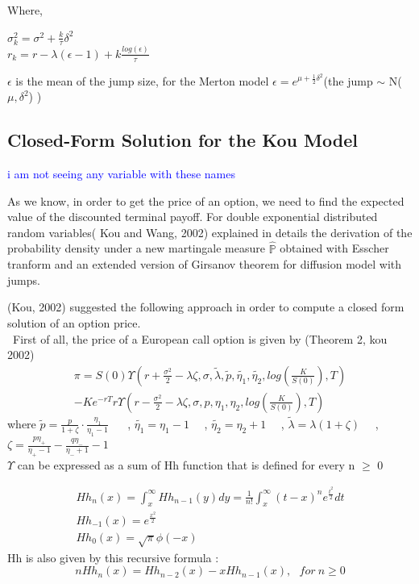 \documentclass[12pt]{report}
\begin{document}
Where,
\begin{center}
$\sigma_k^2=\sigma^2+\frac{k}{\tau} \delta^2$\\
$r_k=r-\lambda(\epsilon-1)+k \frac{log(\epsilon)}{\tau}$\\
\end{center} 
$\epsilon$ is the mean of the jump size, for the Merton model $\epsilon = e^{\mu+\frac{1}{2}\delta^2}$(the jump $\sim$ N($\mu,\delta^2$) )
\subsection{Closed-Form Solution for the Kou Model}
\textcolor{blue}{i am not seeing any variable with these names} 

As we know, in order to get the price of an option, we need to find the expected value of the discounted
terminal payoff. For double exponential distributed random variables( Kou and Wang, 2002) explained in details the derivation of the probability density under a new martingale measure $\mathbb{\hat{P}}$ obtained with Esscher tranform and an extended version of Girsanov theorem for diffusion model with jumps.

(Kou, 2002) suggested the following approach in order to compute a closed form solution of an option price.\\
 ~First of all, the price of a European call option is given by (Theorem 2, kou 2002)
\begin{align*}
\pi=S(0) \Upsilon(r+\frac{\sigma^2}{2}-\lambda  \zeta,\sigma,\tilde{\lambda},\tilde{p},\tilde{\eta_1},\tilde{\eta_2},log(\frac{K}{S(0)}),T)\\
-K e^{-r T}r \Upsilon(r-\frac{\sigma^2}{2}-\lambda \zeta,\sigma,p,\eta_1,\eta_2,log(\frac{K}{S(0)}),T)
\end{align*}
where
$\tilde{p}=\frac{p}{1+\zeta} \cdot \frac{\eta_1}{\eta_1-1}$ ~~ ,
$\tilde{\eta_1}=\eta_1-1$~~ ,
$\tilde{\eta_2}=\eta_2+1$~~ ,
$\tilde{\lambda}= \lambda (1+\zeta)$~~ ,
$\zeta=\frac{p \eta_+}{\eta_+ -1}-\frac{q \eta_-}{\eta_- + 1}-1$\\


 $\Upsilon$ can be expressed as a sum of Hh function that is defined for every n $\geqslant$ 0 

\begin{gather}
Hh_n(x)=\int_{x}^{\infty}Hh_{n-1}(y)dy=\frac{1}{n!}\int_{x}^{\infty}(t-x)^n e^{\frac{t^2}{2}}dt\\
Hh_{-1}(x)=e^{\frac{x^2}{2}}\\
Hh_{0}(x)=\sqrt{\pi }\phi(-x) 
\end{gather}
Hh is also given by this recursive formula :
\begin{equation}
nHh_n(x)=Hh_{n-2}(x)-xHh_{n-1}(x), ~~~ for~ n \geqslant 0
\end{equation}
\end{document}
